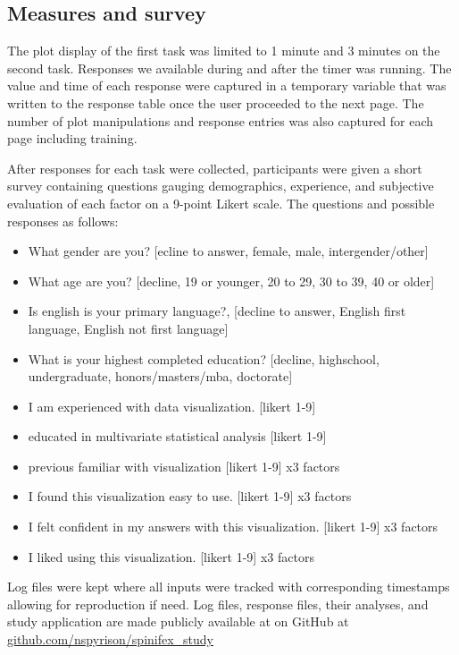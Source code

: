 \documentclass[
]{article}
\providecommand{\tightlist}{%
  \setlength{\itemsep}{0pt}\setlength{\parskip}{0pt}}
\begin{document}
\hypertarget{sec:response}{%
\subsection{Measures and survey}\label{sec:response}}

The plot display of the first task was limited to 1 minute and 3 minutes
on the second task. Responses we available during and after the timer
was running. The value and time of each response were captured in a
temporary variable that was written to the response table once the user
proceeded to the next page. The number of plot manipulations and
response entries was also captured for each page including training.

After responses for each task were collected, participants were given a
short survey containing questions gauging demographics, experience, and
subjective evaluation of each factor on a 9-point Likert scale. The
questions and possible responses as follows:

\begin{itemize}
\tightlist
\item
  What gender are you? {[}ecline to answer, female, male,
  intergender/other{]}
\item
  What age are you? {[}decline, 19 or younger, 20 to 29, 30 to 39, 40 or
  older{]}
\item
  Is english is your primary language?, {[}decline to answer, English
  first language, English not first language{]}
\item
  What is your highest completed education? {[}decline, highschool,
  undergraduate, honors/masters/mba, doctorate{]}
\item
  I am experienced with data visualization. {[}likert 1-9{]}
\item
  educated in multivariate statistical analysis {[}likert 1-9{]}
\item
  previous familiar with visualization {[}likert 1-9{]} x3 factors
\item
  I found this visualization easy to use. {[}likert 1-9{]} x3 factors
\item
  I felt confident in my answers with this visualization. {[}likert
  1-9{]} x3 factors
\item
  I liked using this visualization. {[}likert 1-9{]} x3 factors
\end{itemize}

Log files were kept where all inputs were tracked with corresponding
timestamps allowing for reproduction if need. Log files, response files,
their analyses, and study application are made publicly available at on
GitHub at
\href{https://github.com/nspyrison/spinifex_study}{github.com/nspyrison/spinifex\_study}
\end{document}
